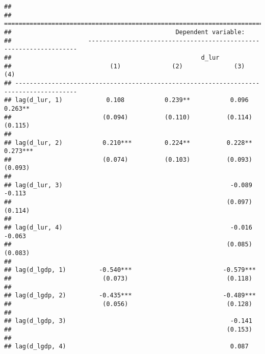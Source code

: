 \documentclass[
]{article}
\begin{document}
\begin{verbatim}
## 
## =======================================================================================
##                                             Dependent variable:                        
##                     -------------------------------------------------------------------
##                                                    d_lur                               
##                           (1)              (2)              (3)              (4)       
## ---------------------------------------------------------------------------------------
## lag(d_lur, 1)            0.108           0.239**           0.096           0.263**     
##                         (0.094)          (0.110)          (0.114)          (0.115)     
##                                                                                        
## lag(d_lur, 2)           0.210***         0.224**          0.228**          0.273***    
##                         (0.074)          (0.103)          (0.093)          (0.093)     
##                                                                                        
## lag(d_lur, 3)                                              -0.089           -0.113     
##                                                           (0.097)          (0.114)     
##                                                                                        
## lag(d_lur, 4)                                              -0.016           -0.063     
##                                                           (0.085)          (0.083)     
##                                                                                        
## lag(d_lgdp, 1)         -0.540***                         -0.579***                     
##                         (0.073)                           (0.118)                      
##                                                                                        
## lag(d_lgdp, 2)         -0.435***                         -0.489***                     
##                         (0.056)                           (0.128)                      
##                                                                                        
## lag(d_lgdp, 3)                                             -0.141                      
##                                                           (0.153)                      
##                                                                                        
## lag(d_lgdp, 4)                                             0.087                       

\end{verbatim}
\end{document}
